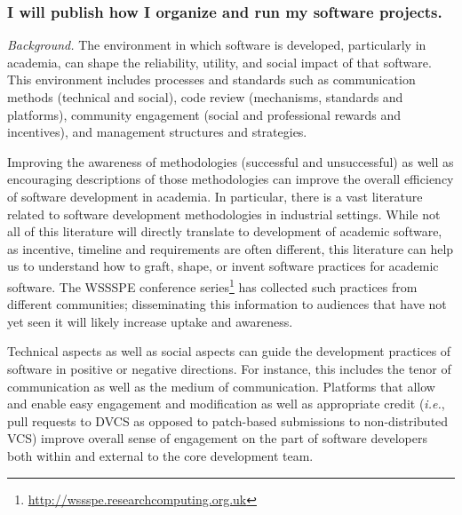 \documentclass[a4paper,UKenglish]{dagman}
\renewcommand{\paragraph}[1]{\subsubsection*{#1}\xspace}
\newcommand{\ie}{\emph{i.e.},\xspace}
\newcommand{\etc}{\emph{etc.}\xspace}
\begin{document}



\paragraph{I will publish how I organize and run my software projects.}




\emph{Background.} The environment in which software is developed, particularly in academia, can shape the reliability, utility, and social impact of that software.  This environment includes processes and standards such as communication methods (technical and social), code review (mechanisms, standards and platforms), community engagement (social and professional rewards and incentives), and management structures and strategies.

Improving the awareness of methodologies (successful and unsuccessful) as well as encouraging descriptions of those methodologies can improve the overall efficiency of software development in academia.  In particular, there is a vast literature related to software development methodologies in industrial settings. While not all of this literature will directly translate to development of academic software, as incentive, timeline and requirements are often different, this literature can help us to understand how to graft, shape, or invent software practices for academic software.
The WSSSPE conference series\footnote{\url{http://wssspe.researchcomputing.org.uk}} has collected such practices from different communities; disseminating this information to audiences that have not yet seen it will likely increase uptake and awareness.

Technical aspects as well as social aspects can guide the development practices of software in positive or negative directions.  For instance, this includes the tenor of communication as well as the medium of communication.  Platforms that allow and enable easy engagement and modification as well as appropriate credit (\ie pull requests to DVCS as opposed to patch-based submissions to non-distributed VCS) improve overall sense of engagement on the part of software developers both within and external to the core development team.
\end{document}
